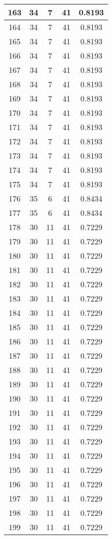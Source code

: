 \documentclass[letterpaper, 12pt]{article}
\begin{document}
\begin{longtable}{|c|c|c|c|c|}
\hline
163 & 34 & 7 & 41 & 0.8193 \\
\hline
164 & 34 & 7 & 41 & 0.8193 \\
\hline
165 & 34 & 7 & 41 & 0.8193 \\
\hline
166 & 34 & 7 & 41 & 0.8193 \\
\hline
167 & 34 & 7 & 41 & 0.8193 \\
\hline
168 & 34 & 7 & 41 & 0.8193 \\
\hline
169 & 34 & 7 & 41 & 0.8193 \\
\hline
170 & 34 & 7 & 41 & 0.8193 \\
\hline
171 & 34 & 7 & 41 & 0.8193 \\
\hline
172 & 34 & 7 & 41 & 0.8193 \\
\hline
173 & 34 & 7 & 41 & 0.8193 \\
\hline
174 & 34 & 7 & 41 & 0.8193 \\
\hline
175 & 34 & 7 & 41 & 0.8193 \\
\hline
176 & 35 & 6 & 41 & 0.8434 \\
\hline
177 & 35 & 6 & 41 & 0.8434 \\
\hline
178 & 30 & 11 & 41 & 0.7229 \\
\hline
179 & 30 & 11 & 41 & 0.7229 \\
\hline
180 & 30 & 11 & 41 & 0.7229 \\
\hline
181 & 30 & 11 & 41 & 0.7229 \\
\hline
182 & 30 & 11 & 41 & 0.7229 \\
\hline
183 & 30 & 11 & 41 & 0.7229 \\
\hline
184 & 30 & 11 & 41 & 0.7229 \\
\hline
185 & 30 & 11 & 41 & 0.7229 \\
\hline
186 & 30 & 11 & 41 & 0.7229 \\
\hline
187 & 30 & 11 & 41 & 0.7229 \\
\hline
188 & 30 & 11 & 41 & 0.7229 \\
\hline
189 & 30 & 11 & 41 & 0.7229 \\
\hline
190 & 30 & 11 & 41 & 0.7229 \\
\hline
191 & 30 & 11 & 41 & 0.7229 \\
\hline
192 & 30 & 11 & 41 & 0.7229 \\
\hline
193 & 30 & 11 & 41 & 0.7229 \\
\hline
194 & 30 & 11 & 41 & 0.7229 \\
\hline
195 & 30 & 11 & 41 & 0.7229 \\
\hline
196 & 30 & 11 & 41 & 0.7229 \\
\hline
197 & 30 & 11 & 41 & 0.7229 \\
\hline
198 & 30 & 11 & 41 & 0.7229 \\
\hline
199 & 30 & 11 & 41 & 0.7229 \\
\hline
\end{longtable}
\end{document}
